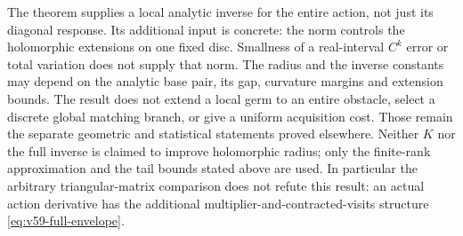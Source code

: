 The theorem supplies a local analytic inverse for the entire action, not
just its diagonal response.  Its additional input is concrete: the norm
controls the holomorphic extensions on one fixed disc.  Smallness of a
real-interval $C^k$ error or total variation does not supply that norm.
The radius and the inverse constants may depend on the analytic base
pair, its gap, curvature margins and extension bounds.  The result does
not extend a local germ to an entire obstacle, select a discrete global
matching branch, or give a uniform acquisition cost.  Those remain the
separate geometric and statistical statements proved elsewhere.
Neither $K$ nor the full inverse is claimed to improve holomorphic radius;
only the finite-rank approximation and the tail bounds stated above are
used.  In particular the arbitrary triangular-matrix comparison does not
refute this result: an actual action derivative has the additional
multiplier-and-contracted-visits structure \eqref{eq:v59-full-envelope}.
